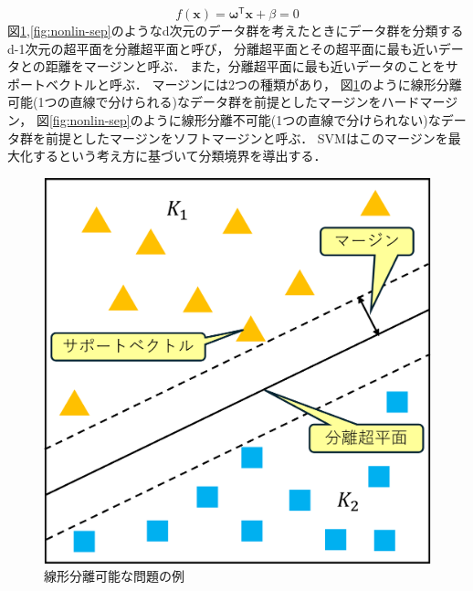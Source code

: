 \documentclass[11pt,a4paper,titlepage]{ltjsarticle}
\begin{document}
\begin{equation}
    \label{bord}
        f(\bm{x}) = \bm{\omega}^\mathsf{T}\bm{x} + \beta = 0 
\end{equation}
図\ref{fig:lin-sep},\ref{fig:nonlin-sep}のようなd次元のデータ群を考えたときにデータ群を分類するd-1次元の超平面を分離超平面と呼び，
分離超平面とその超平面に最も近いデータとの距離をマージンと呼ぶ．
また，分離超平面に最も近いデータのことをサポートベクトルと呼ぶ．
マージンには2つの種類があり，
図\ref{fig:lin-sep}のように線形分離可能(1つの直線で分けられる)なデータ群を前提としたマージンをハードマージン，
図\ref{fig:nonlin-sep}のように線形分離不可能(1つの直線で分けられない)なデータ群を前提としたマージンをソフトマージンと呼ぶ．
SVMはこのマージンを最大化するという考え方に基づいて分類境界を導出する．
\begin{figure}[H]
    \centering
    \begin{minipage}[b]{0.45\textwidth}
        \centering
        \includegraphics[width=1.0\columnwidth]{image/linear-separative.png}
        \caption{線形分離可能な問題の例}
        \label{fig:lin-sep}
    \end{minipage}
    \begin{minipage}[b]{0.45\textwidth}
        \centering

\end{minipage}
\end{figure}
\end{document}
